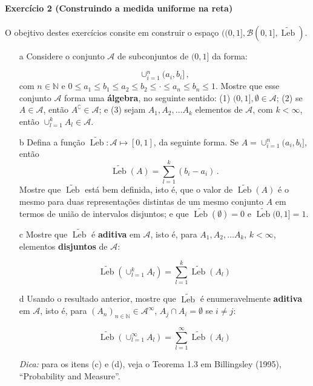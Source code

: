 \documentclass[10pt,a4paper]{article}
\begin{document}
	\paragraph{Exercício 2 (Construindo a medida uniforme na reta)} O obejtivo destes exercícios consite em construir o espaço $((0,1],\mathcal{B}(0,1], \widetilde{\operatorname{Leb}})$.
	\begin{itemize}
		\item[a] Considere o conjunto $\mathcal{A}$ de subconjuntos de $(0,1]$ da forma:
		
		$$\cup_{i=1}^n (a_i,b_i]\, ,$$
		com $n \in \mathbb{N}$ e $0\leq a_1\leq b_1 \leq a_2\leq b_2 \leq \cdot \leq a_n \leq b_n \leq 1$. Mostre que esse conjunto $\mathcal{A}$ forma uma \textbf{álgebra}, no seguinte sentido: (1) $(0,1], \emptyset \in \mathcal{A}$; (2) se $A\in \mathcal{A}$, então $A^\complement \in \mathcal{A}$; e (3) sejam $A_1, A_2, \ldots A_k$ elementos de $\mathcal{A}$, com $k <\infty$, então $\cup_{l=1}^k A_l \in \mathcal{A}$.
		\item[b] Defina a função ${\widetilde{\operatorname{Leb}}}: \mathcal{A}\mapsto [0,1]$, da seguinte forma. Se $A = \cup_{i=1}^n (a_i,b_i]$, então
		$${\widetilde{\operatorname{Leb}}}(A) = \sum_{l=1}^k (b_i - a_i)\, .$$
		Mostre que $\widetilde{\operatorname{Leb}}$ está bem definida, isto é, que o valor de ${\widetilde{\operatorname{Leb}}}(A)$ é o mesmo para duas representações distintas de um mesmo conjunto $A$ em termos de união de intervalos disjuntos; e que ${\widetilde{\operatorname{Leb}}}(\emptyset) = 0$ e ${\widetilde{\operatorname{Leb}}}(0,1]=1$.
		
		\item[c] Mostre que ${\widetilde{\operatorname{Leb}}}$ é \textbf{aditiva} em $\mathcal{A}$, isto é, para $A_1, A_2, \ldots A_k$, $k <\infty$, elementos \textbf{disjuntos} de $\mathcal{A}$:
		
		$$\widetilde{\operatorname{Leb}}(\cup_{l=1}^k A_l) = \sum_{l=1}^k \widetilde{\operatorname{Leb}}(A_l)$$
		\item[d] Usando o resultado anterior, mostre que   $\widetilde{\operatorname{Leb}}$ é enumeravelmente \textbf{aditiva} em $\mathcal{A}$, isto é, para  $(A_n)_{n \in \mathbb{N}} \in \mathcal{A}^\infty$, $A_j \cap A_i = \emptyset$ se $i \neq j$:
		
		$$\widetilde{\operatorname{Leb}}(\cup_{l=1}^\infty A_l) = \sum_{l=1}^\infty \widetilde{\operatorname{Leb}}(A_l)$$
		
		\textit{Dica:} para os itens (c) e (d), veja o Teorema 1.3 em Billingsley (1995), ``Probability and Measure''.
		

\end{itemize}
\end{document}
